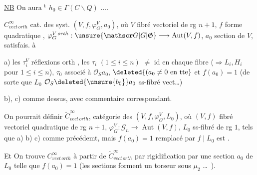 \uline{ NB} On aura $^{\mathrm t}$ $h_0\in\Gamma(C\smallsetminus Q)$ ....

$C^\infty_{vect\,orth}$ cat. des syst. $(V,f,\varphi_G^V,a_0)$, où $V$ fibré vectoriel de rg $n+1$, $f$ forme quadratique , $\varphi_G^{V\,orth}:\unsure{\mathscr G|G|\mathfrak G}\longrightarrow\operatorname{Aut}(V,f)$, $a_0$ section de $V$, satisfais. à

a) les $\tau_i^V$ réflexions orth , les $\tau_i$ $(1\leq i\leq n)$  $\ne$ id en chaque fibre ($\Rightarrow L_i,H_i$ pour $1\leq i\leq n$), $\tau_0$ associé à $\mathcal O_S a_0$, $\deleted{(a_0\ne0\text{ en tte}}$ et $\boxed{f(a_0)=1}$ (de sorte que $L_0$ $\mathcal O_S\deleted{\unsure{b_0}}a_0$ ss-fibré vect\ldots)

b), c) comme dessus, avec commentaire correspondant.

On pourrait définir $\widetilde C^\infty_{vect\,orth}$, catégorie des  $(V,f,\varphi_G^V,L_0)$, où   $(V,f)$ fibré vectoriel quadratique  de rg $n+1$, $\varphi_G^V:\mathscr G_n\longrightarrow\operatorname{Aut}(V,f)$, $L_0$ ss-fibré de rg $1$, tels que a) b) c) comme précédemt, mais $f(a_0)=1$ remplacé par $f\mid L_0$ est \uline{}.

Et On trouve $C^\infty_{vect\,orth}$ à partir de $\widetilde C^\infty_{vect\,orth}$ par rigidification par une section $a_0$ de $L_0$ telle que $f(a_0)=1$ (les sections forment un torseur sous $\mu_2$ \ldots\ ).



